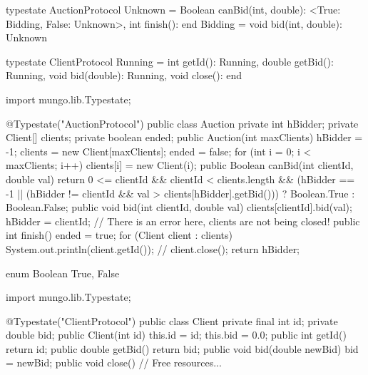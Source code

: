 \begin{code}
typestate AuctionProtocol {
  Unknown = {
    Boolean canBid(int, double): <True: Bidding, False: Unknown>,
    int finish(): end
  }
  Bidding = {
    void bid(int, double): Unknown
  }
}\end{code}

\begin{code}
typestate ClientProtocol {
  Running = {
    int getId(): Running,
    double getBid(): Running,
    void bid(double): Running,
    void close(): end
  }
}\end{code}

\begin{code}
import mungo.lib.Typestate;

@Typestate("AuctionProtocol")
public class Auction {
  private int hBidder;
  private Client[] clients;
  private boolean ended;
  public Auction(int maxClients) {
    hBidder = -1;
    clients = new Client[maxClients];
    ended = false;
    for (int i = 0; i < maxClients; i++)
      clients[i] = new Client(i);
  }
  public Boolean canBid(int clientId, double val) {
    return 0 <= clientId && clientId < clients.length &&
           (hBidder == -1 ||
           (hBidder != clientId && val > clients[hBidder].getBid())) ?
              Boolean.True :
              Boolean.False;
  }
  public void bid(int clientId, double val) {
    clients[clientId].bid(val);
    hBidder = clientId;
  }
  // There is an error here, clients are not being closed!
  public int finish() {
    ended = true;
    for (Client client : clients) {
      System.out.println(client.getId());
      // client.close();
    }
    return hBidder;
  }
}\end{code}

\begin{code}
enum Boolean {
  True, False
}\end{code}

\begin{code}
import mungo.lib.Typestate;

@Typestate("ClientProtocol")
public class Client {
  private final int id;
	private double bid;
	public Client(int id) {
    this.id = id;
		this.bid = 0.0;
	}
  public int getId() {
    return id;
  }
  public double getBid() {
    return bid;
  }
	public void bid(double newBid) {
    bid = newBid;
  }
  public void close() {
    // Free resources...
  }
}\end{code}

